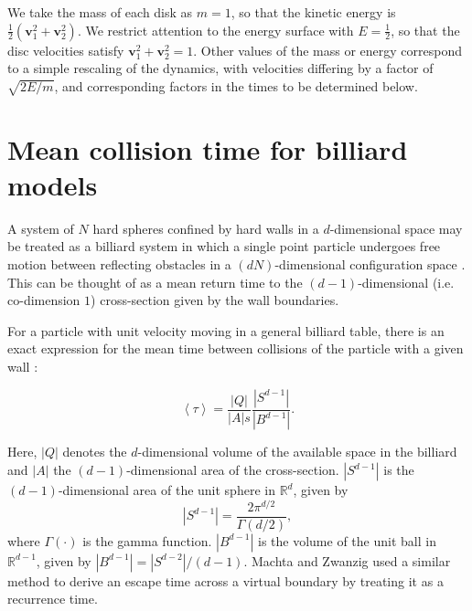 \documentclass[superscriptaddress,pre,reprint,showpacs,onecolumn]{revtex4-1}
\newcommand{\mean}[1]{\left \langle #1 \right \rangle}
\newcommand{\RR}{\mathbb{R}}
\begin{document}
We take the mass of each disk as $m=1$, so that the kinetic energy
is $\frac{1}{2}(\mathbf{v}_1^2 + \mathbf{v}_2^2)$. We restrict attention to the energy surface with
$E = \frac{1}{2}$, so that the disc velocities satisfy $\mathbf{v}_1^2 + \mathbf{v}_2^2 = 1$.
Other values of the mass or energy correspond to a simple rescaling of the dynamics, with velocities differing
by a factor of
$\sqrt{2E/m}$, and corresponding factors in the times to be determined below.


\section{Mean collision time for billiard models}

\label{knownfacts}

A system of $N$ hard spheres confined by hard walls in a $d$-dimensional
space may be treated as a billiard system 
in which a single point  particle undergoes free motion between reflecting obstacles 
in a $ (d N) $-dimensional configuration space \cite{Sinai70, Sim99, MarkChern}. 
This can be thought of as a mean return time to the $(d-1)$-dimensional 
(i.e. co-dimension $1$) cross-section given by the wall boundaries.

For a particle with unit velocity moving in a general billiard table, there is 
an exact expression for the mean time between 
collisions of the particle with a given wall \cite{Chernov97}:

\begin{equation}\label{meanfreetime}
 \mean{\tau} = \frac{|Q|}{|A|s} \frac{|S^{d-1}|} {|B^{d-1}|}.
\end{equation}


Here, $|Q|$ denotes the $d$-dimensional volume of the available 
space in the billiard and 
$|A|$ the $(d-1)$-dimensional area of the cross-section.
 $|S^{d-1}|$ is the $(d-1)$-dimensional area of the unit sphere in $\RR^d$, given by
\begin{equation}
  |S^{d-1}| = \frac{2 \pi^{d/2}}{\Gamma(d/2)},
\end{equation}
where $\Gamma(\cdot)$ is the gamma function. 
$|B^{d-1}|$ is the volume of the unit ball 
in $\RR^{d-1}$, given by $|B^{d-1}| = |S^{d-2}| / (d-1)$.
Machta and Zwanzig \cite{MachtaZwan} used a similar method to derive an escape 
time across a virtual boundary by treating it as a recurrence time.
\end{document}
